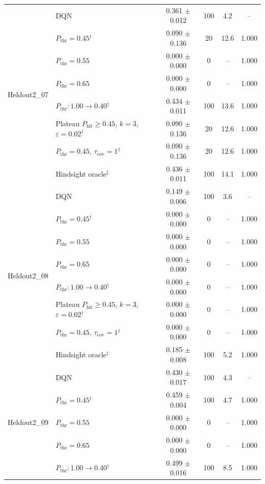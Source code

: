 \begin{table}[htbp]
\begin{tabular}{llcccc}
\midrule
\multirow{8}{*}{Heldout2\_07} & DQN & 0.361 $\pm$ 0.012 & 100 & 4.2 & -- \\
 & $P_{\mathrm{thr}}=0.45$$^{\dagger}$ & 0.090 $\pm$ 0.136 & 20 & 12.6 & 1.000 \\
 & $P_{\mathrm{thr}}=0.55$ & 0.000 $\pm$ 0.000 & 0 & -- & 1.000 \\
 & $P_{\mathrm{thr}}=0.65$ & 0.000 $\pm$ 0.000 & 0 & -- & 1.000 \\
 & $P_{\mathrm{thr}}: 1.00 \to 0.40$$^{\dagger}$ & 0.434 $\pm$ 0.011 & 100 & 13.6 & 1.000 \\
 & Plateau $P_{\mathrm{hit}}\geq0.45$, $k=3$, $\varepsilon=0.02$$^{\dagger}$ & 0.090 $\pm$ 0.136 & 20 & 12.6 & 1.000 \\
 & $P_{\mathrm{thr}}=0.45$, $\tau_{\mathrm{cov}}=1$$^{\dagger}$ & 0.090 $\pm$ 0.136 & 20 & 12.6 & 1.000 \\
 & Hindsight oracle$^{\ddagger}$ & 0.436 $\pm$ 0.011 & 100 & 14.1 & 1.000 \\
\midrule
\multirow{8}{*}{Heldout2\_08} & DQN & 0.149 $\pm$ 0.006 & 100 & 3.6 & -- \\
 & $P_{\mathrm{thr}}=0.45$$^{\dagger}$ & 0.000 $\pm$ 0.000 & 0 & -- & 1.000 \\
 & $P_{\mathrm{thr}}=0.55$ & 0.000 $\pm$ 0.000 & 0 & -- & 1.000 \\
 & $P_{\mathrm{thr}}=0.65$ & 0.000 $\pm$ 0.000 & 0 & -- & 1.000 \\
 & $P_{\mathrm{thr}}: 1.00 \to 0.40$$^{\dagger}$ & 0.000 $\pm$ 0.000 & 0 & -- & 1.000 \\
 & Plateau $P_{\mathrm{hit}}\geq0.45$, $k=3$, $\varepsilon=0.02$$^{\dagger}$ & 0.000 $\pm$ 0.000 & 0 & -- & 1.000 \\
 & $P_{\mathrm{thr}}=0.45$, $\tau_{\mathrm{cov}}=1$$^{\dagger}$ & 0.000 $\pm$ 0.000 & 0 & -- & 1.000 \\
 & Hindsight oracle$^{\ddagger}$ & 0.185 $\pm$ 0.008 & 100 & 5.2 & 1.000 \\
\midrule
\multirow{8}{*}{Heldout2\_09} & DQN & 0.430 $\pm$ 0.017 & 100 & 4.3 & -- \\
 & $P_{\mathrm{thr}}=0.45$$^{\dagger}$ & 0.459 $\pm$ 0.004 & 100 & 4.7 & 1.000 \\
 & $P_{\mathrm{thr}}=0.55$ & 0.000 $\pm$ 0.000 & 0 & -- & 1.000 \\
 & $P_{\mathrm{thr}}=0.65$ & 0.000 $\pm$ 0.000 & 0 & -- & 1.000 \\
 & $P_{\mathrm{thr}}: 1.00 \to 0.40$$^{\dagger}$ & 0.499 $\pm$ 0.016 & 100 & 8.5 & 1.000 \\

\end{tabular}
\end{table}
